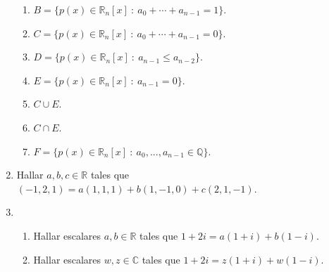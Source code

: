 \begin{enumerate}[resume, topsep=6pt, itemsep=.4cm]
\begin{enumerate}
     \item $B=\{p(x)\in\mathbb{R}_{n}[x] \ : \ a_0 + \cdots + a_{n-1} = 1\}$.
     \item $C=\{p(x)\in\mathbb{R}_{n}[x] \ : \ a_0 + \cdots + a_{n-1} = 0\}$.
     \item $D=\{p(x)\in\mathbb{R}_{n}[x] \ : \ a_{n-1} \le a_{n-2}\}$.
     \item $E=\{p(x)\in\mathbb{R}_{n}[x] \ : \ a_{n-1}=0\}$.
     \item $C\cup E$.
     \item $C\cap E$.
     \item $F=\{p(x)\in\mathbb{R}_{n}[x] \ : \  a_0, ..., a_{n-1}\in\mathbb{Q}\}$.
%     
%
     \end{enumerate}


\item  Hallar $a, b, c\in \mathbb{R}$ tales que $(-1,2,1)=a(1,1,1)+b(1,-1,0)+c(2,1,-1)$.


\item
\begin{enumerate}
    \item Hallar escalares $a, b \in \mathbb R$ tales que $1+2i=a(1+i)+b(1-i)$.
    \item  Hallar escalares $w, z \in \mathbb C$ tales que $1+2i=z(1+i)+w(1-i)$.
\end{enumerate}
%



\end{enumerate}
